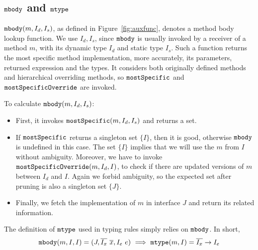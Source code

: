 \subsection{$\texttt{mbody}$ and $\texttt{mtype}$}

$\texttt{mbody}(m, I_d, I_s)$, as defined in Figure~\ref{fig:auxfunc}, denotes a method body lookup function.
We use $I_d, I_s$, since $\texttt{mbody}$ is usually invoked by a receiver of a method $m$, with its dynamic
type $I_d$ and static type $I_s$. Such a function returns the most specific method implementation, more
accurately, its parameters, returned expression and the types. It considers both originally defined methods and hierarchical overriding methods, so $\texttt{mostSpecific}$ and $\texttt{mostSpecificOverride}$ are invoked.

To calculate $\texttt{mbody}(m, I_d, I_s)$:
\begin{itemize}
    \item First, it invokes $\texttt{mostSpecific}(m, I_d, I_s)$ and returns a set.
    \item If $\texttt{mostSpecific}$ returns a singleton set $\{I\}$, then it is good, otherwise $\texttt{mbody}$ is undefined in
    this case. The set $\{I\}$ implies that we will use the $m$ from $I$ without ambiguity. Moreover, we have to invoke $\texttt{mostSpecificOverride}(m, I_d, I)$, to check if there are updated versions of $m$ between $I_d$ and $I$. Again we forbid ambiguity, so the expected set after pruning is also a singleton set $\{J\}$.
    \item Finally, we fetch the implementation of $m$ in interface $J$ and return its related information.
\end{itemize}
The definition of $\texttt{mtype}$ used in typing rules simply relies on $\texttt{mbody}$. In short,
$$\texttt{mbody}(m, I, I) = (J, \overline{I_x}\ \overline{x}, I_e\ e) \ \Longrightarrow\ \texttt{mtype}(m, I) = \overline{I_x}\rightarrow I_e$$

